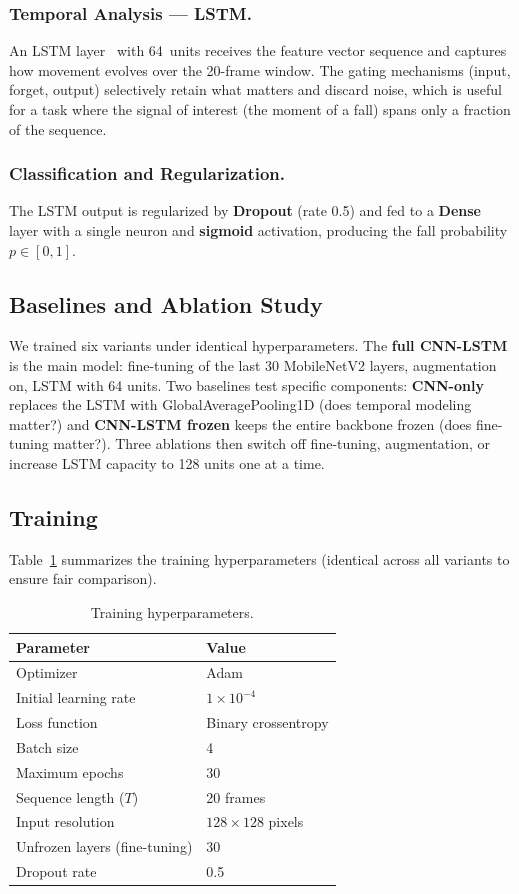 \documentclass[runningheads]{llncs}
\begin{document}
\subsubsection{Temporal Analysis --- LSTM.}
An LSTM layer~\cite{lstm1997} with 64~units receives the feature vector sequence and captures how movement evolves over the 20-frame window. The gating mechanisms (input, forget, output) selectively retain what matters and discard noise, which is useful for a task where the signal of interest (the moment of a fall) spans only a fraction of the sequence.

\subsubsection{Classification and Regularization.}
The LSTM output is regularized by \textbf{Dropout} (rate 0.5) and fed to a \textbf{Dense} layer with a single neuron and \textbf{sigmoid} activation, producing the fall probability $p \in [0,1]$.

\subsection{Baselines and Ablation Study}\label{sec:baselines}

We trained six variants under identical hyperparameters. The \textbf{full CNN-LSTM} is the main model: fine-tuning of the last 30 MobileNetV2 layers, augmentation on, LSTM with 64 units. Two baselines test specific components: \textbf{CNN-only} replaces the LSTM with GlobalAveragePooling1D (does temporal modeling matter?) and \textbf{CNN-LSTM frozen} keeps the entire backbone frozen (does fine-tuning matter?). Three ablations then switch off fine-tuning, augmentation, or increase LSTM capacity to 128 units one at a time.

\subsection{Training}

Table~\ref{tab:hyperparams} summarizes the training hyperparameters (identical across all variants to ensure fair comparison).

\begin{table}
\centering
\caption{Training hyperparameters.}\label{tab:hyperparams}
\begin{tabular}{|l|l|}
\hline
\textbf{Parameter} & \textbf{Value} \\
\hline
Optimizer & Adam \\
Initial learning rate & $1 \times 10^{-4}$ \\
Loss function & Binary crossentropy \\
Batch size & 4 \\
Maximum epochs & 30 \\
Sequence length ($T$) & 20 frames \\
Input resolution & $128 \times 128$ pixels \\
Unfrozen layers (fine-tuning) & 30 \\
Dropout rate & 0.5 \\
\hline
\end{tabular}
\end{table}
\end{document}
